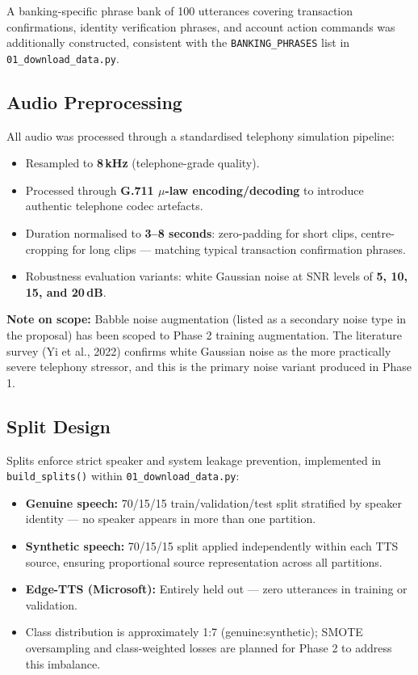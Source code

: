 \documentclass[12pt,a4paper]{report}
\begin{document}
\medskip
A banking-specific phrase bank of 100 utterances covering transaction confirmations,
identity verification phrases, and account action commands was additionally constructed,
consistent with the \texttt{BANKING\_PHRASES} list in \texttt{01\_download\_data.py}.

\subsection{Audio Preprocessing}

All audio was processed through a standardised telephony simulation pipeline:

\begin{itemize}
  \item Resampled to \textbf{8\,kHz} (telephone-grade quality).
  \item Processed through \textbf{G.711 $\mu$-law encoding/decoding} to introduce
    authentic telephone codec artefacts.
  \item Duration normalised to \textbf{3--8 seconds}: zero-padding for short clips,
    centre-cropping for long clips --- matching typical transaction confirmation phrases.
  \item Robustness evaluation variants: white Gaussian noise at SNR levels of
    \textbf{5, 10, 15, and 20\,dB}.
\end{itemize}

\begin{infobox}
  \textbf{Note on scope:} Babble noise augmentation (listed as a secondary noise type in
  the proposal) has been scoped to Phase 2 training augmentation. The literature survey
  (Yi et al., 2022) confirms white Gaussian noise as the more practically severe
  telephony stressor, and this is the primary noise variant produced in Phase 1.
\end{infobox}

\subsection{Split Design}

Splits enforce strict speaker and system leakage prevention, implemented in
\texttt{build\_splits()} within \texttt{01\_download\_data.py}:

\begin{itemize}
  \item \textbf{Genuine speech:} 70/15/15 train/validation/test split stratified by
    speaker identity --- no speaker appears in more than one partition.
  \item \textbf{Synthetic speech:} 70/15/15 split applied independently within each
    TTS source, ensuring proportional source representation across all partitions.
  \item \textbf{Edge-TTS (Microsoft):} Entirely held out --- zero utterances in
    training or validation.
  \item Class distribution is approximately 1:7 (genuine:synthetic); SMOTE oversampling
    and class-weighted losses are planned for Phase 2 to address this imbalance.
\end{itemize}
\end{document}
